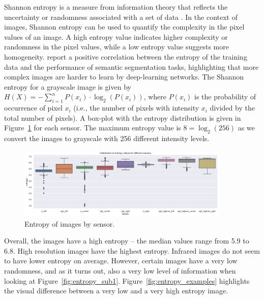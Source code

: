 \documentclass[Master,MDS,english]{BASE/twbook} %
\begin{document}
Shannon entropy is a measure from information theory that reflects the uncertainty or randomness associated with a set of data \citep{6773024}. In the context of images, Shannon entropy can be used to quantify the complexity in the pixel values of an image. A high entropy value indicates higher complexity or randomness in the pixel values, while a low entropy value suggests more homogeneity. \cite{rahane2020measures} report a positive correlation between the entropy of the training data and the performance of semantic segmentation tasks, highlighting that more complex images are harder to learn by deep-learning networks.
The Shannon entropy for a grayscale image is given by $H(X) = -\sum_{i=1}^{n} P(x_i) \cdot \log_2(P(x_i))$, where $P(x_i)$ is the probability of occurrence of pixel $x_i$ (i.e., the number of pixels with intensity $x_i$ divided by the total number of pixels). 
A box-plot with the entropy distribution is given in Figure~\ref{fig:entropy} for each sensor. The maximum entropy value is $8 = \log_2(256)$ as we convert the images to grayscale with 256 different intensity levels.


\begin{figure}[H]
\centering
\includegraphics[width=0.9\textwidth]{images/datasets/db/entropy}
\caption{Entropy of images by sensor. }
\label{fig:entropy}
\end{figure}

Overall, the images have a high entropy -- the median values range from 5.9 to 6.8. High resolution images have the highest entropy. Infrared images do not seem to have lower entropy on average. However, certain images have a very low randomness, and as it turns out, also a very low level of information when looking at Figure~\ref{fig:entropy_sub1}. Figure~\ref{fig:entropy_examples} highlights the visual difference between a very low and a very high entropy image.
\end{document}
